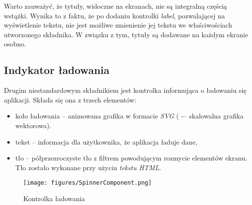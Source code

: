 Warto zauważyć, że tytuły, widoczne na ekranach, nie są integralną częścią wstążki. Wynika to z faktu, że po dodaniu kontrolki \emph{label}, pozwalającej na wyświetlenie tekstu, nie jest możliwe zmienienie jej tekstu we właściwościach utworzonego składnika. W związku z tym, tytuły są dodawane na każdym ekranie osobno.


\subsection{Indykator ładowania}
Drugim niestandardowym składnikiem jest kontrolka informująca o ładowaniu się aplikacji. Składa się ona z trzech elementów:
\begin{itemize}
    \item koło ładowania -- animowana grafika w formacie \emph{SVG} ( -– skalowalna grafika wektorowa).
    \item tekst -- informacja dla użytkownika, że aplikacja ładuje dane,
    \item tło -- półprzezroczyste tło z filtrem powodującym rozmycie elementów ekranu. Tło zostało wykonane przy użyciu \emph{tekstu HTML}.
\end{itemize}

\begin{figure}[H]
    \centering
    \texttt{[image: figures/SpinnerComponent.png]}
    \caption{Kontrolka ładowania}
    \label{fig:spinnercomponent}
\end{figure}

